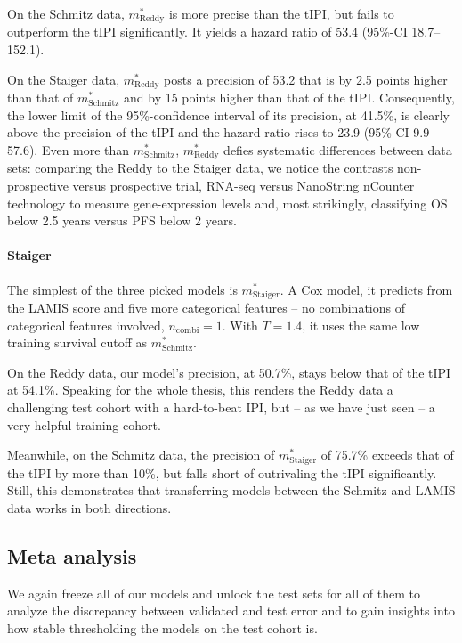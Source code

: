 On the Schmitz data, $m^*_\text{Reddy}$ is more precise than the tIPI, but fails to outperform the 
tIPI significantly. It yields a hazard ratio of \num{53.4} 
(\num{95}\%-CI \num{18.7}--\num{152.1}).

On the Staiger data, $m^*_\text{Reddy}$ posts a precision of \num{53.2} that is by \num{2.5} 
points higher than that of $m^*_\text{Schmitz}$ and by \num{15} points higher than that of the tIPI. 
Consequently, the lower limit of the \num{95}\%-confidence interval of its precision, at 
\num{41.5}\%, is 
clearly above the precision of the tIPI and the hazard ratio rises to \num{23.9}
(\num{95}\%-CI \num{9.9}--\num{57.6}). Even more than $m^*_\text{Schmitz}$, $m^*_\text{Reddy}$ 
defies systematic differences between data sets: comparing the Reddy to the Staiger data, we 
notice the contrasts non-prospective versus prospective trial, 
RNA-seq versus NanoString nCounter technology to measure gene-expression levels and, most strikingly, 
classifying OS below \num{2.5} years versus PFS below \num{2} years.

\paragraph{Staiger}
The simplest of the three picked models is $m^*_\text{Staiger}$. A Cox model, it predicts from 
the LAMIS score and five more categorical features -- no combinations of categorical features involved, 
$n_\text{combi} = 1$. With $T = \num{1.4}$, it uses the same low training survival cutoff as 
$m^*_\text{Schmitz}$.

On the Reddy data, our model's precision, at \num{50.7}\%, stays below that of the tIPI at \num{54.1}\%. 
Speaking for the whole thesis, this renders the Reddy data a challenging test cohort with a 
hard-to-beat IPI, but -- as we have just seen -- a very helpful training cohort.

Meanwhile, on the Schmitz data, the precision of $m^*_\text{Staiger}$ of \num{75.7}\% exceeds that 
of the tIPI by more than \num{10}\%, but falls short of outrivaling the tIPI significantly. Still, 
this demonstrates that transferring models between the Schmitz and LAMIS data works in both 
directions.

\subsection{Meta analysis}\label{subsec:results-inter-meta}

We again freeze all of our models and unlock the test sets for all of them to analyze the discrepancy 
between validated and test error and to gain insights into how stable thresholding the models on the 
test cohort is.

